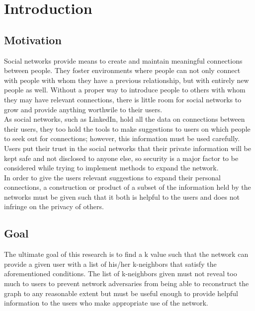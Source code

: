 \section{Introduction}

\subsection{Motivation} 


\indent Social networks provide means to create and maintain meaningful connections between people. They foster environments where people can not only connect with people with whom they have a previous relationship, but with entirely new people as well. Without a proper way to introduce people to others with whom they may have relevant connections, there is little room for social networks to grow and provide anything worthwile to their users. \\

\indent As social networks, such as LinkedIn, hold all the data on connections between their users, they too hold the tools to make suggestions to users on which people to seek out for connections; however, this information must be used carefully. Users put their trust in the social networks that their private information will be kept safe and not disclosed to anyone else, so security is a major factor to be considered while trying to implement methods to expand the network.  \\

\indent In order to give the users relevant suggestions to expand their personal connections, a construction or product of a subset of the information held by the networks must be given such that it both is helpful to the users and does not infringe on the  privacy of others. \\

\subsection{Goal}

\indent The ultimate goal of this research is to find a k value such that the network can provide a given user with a list of his/her k-neighbors that satisfy the aforementioned conditions. The list of k-neighbors given must not reveal too much to users to prevent network adversaries from being able to reconstruct the graph to any reasonable extent but must be useful enough to provide helpful information to the users who make appropriate use of the network. \\

